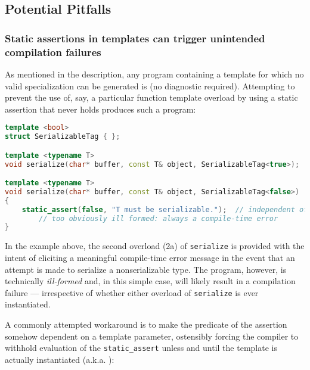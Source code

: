 \subsection[Potential Pitfalls]{Potential Pitfalls}\label{static-potential-pitfalls}

\subsubsection[Static assertions in templates can trigger unintended compilation failures]{Static assertions in templates can trigger unintended compilation failures}\label{static-assertions-in-templates-can-trigger-unintended-compilation-failures}

As mentioned in the description, any program containing a template for
which no valid specialization can be generated is 
 (no diagnostic required). Attempting to prevent the
use of, say, a particular function template overload by using a static
assertion that never holds produces such a program:

\begin{lstlisting}[language=C++]
template <bool>
struct SerializableTag { };

template <typename T>
void serialize(char* buffer, const T& object, SerializableTag<true>);  // (1)

template <typename T>
void serialize(char* buffer, const T& object, SerializableTag<false>)  // (2a)
{
    static_assert(false, "T must be serializable.");  // independent of (ù{\codeincomments{T}}ù)
        // too obviously ill formed: always a compile-time error
}
\end{lstlisting}
    
\noindent In the example above, the second overload (2a) of \lstinline!serialize! is
provided with the intent of eliciting a meaningful compile-time error
message in the event that an attempt is made to serialize a
nonserializable type. The program, however, is technically
\emph{ill-formed} and, in this simple case, will likely result in a
compilation failure --- irrespective of whether either overload of
\lstinline!serialize! is ever instantiated. 

A commonly attempted workaround
is to make the predicate of the assertion somehow dependent on a
template parameter, ostensibly forcing the compiler to withhold
evaluation of the \lstinline!static_assert! unless and until the template
is actually instantiated (a.k.a. ):

